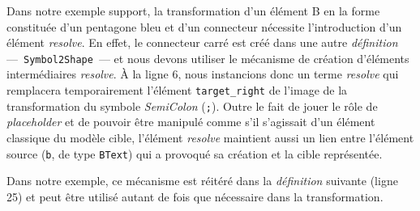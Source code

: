 Dans notre exemple support, la transformation d'un élément \textsf{B} en la
forme constituée d'un pentagone bleu et d'un connecteur nécessite
l'introduction d'un élément \emph{resolve}. En effet, le connecteur carré est
créé dans une autre \emph{définition} ---~\texttt{Symbol2Shape}~--- et nous
devons utiliser le mécanisme de création d'éléments intermédiaires
\emph{resolve}. À la ligne 6, nous instancions donc un terme \emph{resolve} qui
remplacera temporairement l'élément \texttt{target\_right} de l'image de la
transformation du symbole \emph{SemiColon} (\texttt{;}). Outre le fait de jouer
le rôle de \emph{placeholder} et de pouvoir être manipulé comme s'il s'agissait
d'un élément classique du modèle cible, l'élément \emph{resolve} maintient aussi
un lien entre l'élément source (\texttt{b}, de type \texttt{BText}) qui a
provoqué sa création et la cible représentée.

Dans notre exemple, ce mécanisme est réitéré dans la \emph{définition}
suivante (ligne 25) et peut être utilisé autant de fois que nécessaire dans la
transformation.


